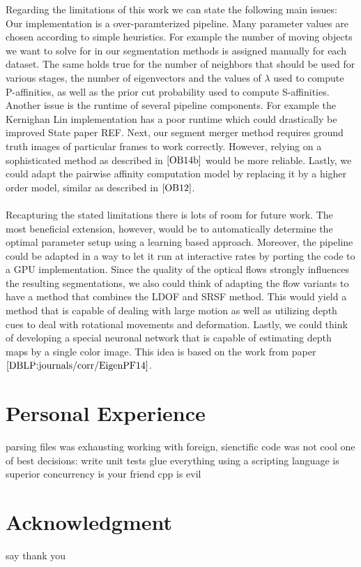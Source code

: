 Regarding the limitations of this work we can state the following main issues: Our implementation is a over-paramterized pipeline. Many parameter values are chosen according to simple heuristics. For example the number of moving objects we want to solve for in our segmentation methods is assigned manually for each dataset. The same holds true for the number of neighbors that should be used for various stages, the number of eigenvectors and the values of $\lambda$ used to compute P-affinities, as well as the prior cut probability used to compute S-affinities. Another issue is the runtime of several pipeline components. For example the Kernighan Lin implementation has a poor runtime which could drastically be improved State paper REF. Next, our segment merger method requires ground truth images of particular frames to work correctly. However, relying on a sophisticated method as described in $\cite{OB14b}$ would be more reliable. Lastly, we could adapt the pairwise affinity computation model by replacing it by a higher order model, similar as described in $\cite{OB12}$. \\ \\
Recapturing the stated limitations there is lots of room for future work.  
The most beneficial extension, however, would be to automatically determine the optimal parameter setup using a learning based approach. Moreover, the pipeline could be adapted in a way to let it run at interactive rates by porting the code to a GPU implementation. Since the quality of the optical flows strongly influences the resulting segmentations, we also could think of adapting the flow variants to have a method that combines the LDOF and SRSF method. This would yield a method that is capable of dealing with large motion as well as utilizing depth cues to deal with rotational movements and deformation. Lastly, we could think of developing a special neuronal network that is capable of estimating depth maps by a single color image. This idea is based on the work from paper $\cite{DBLP:journals/corr/EigenPF14}$.  

\section{Personal Experience}
parsing files was exhausting
working with foreign, sienctific code was not cool
one of best decisions: write unit tests
glue everything using a scripting language is superior
concurrency is your friend
cpp is evil

\section{Acknowledgment}
say thank you